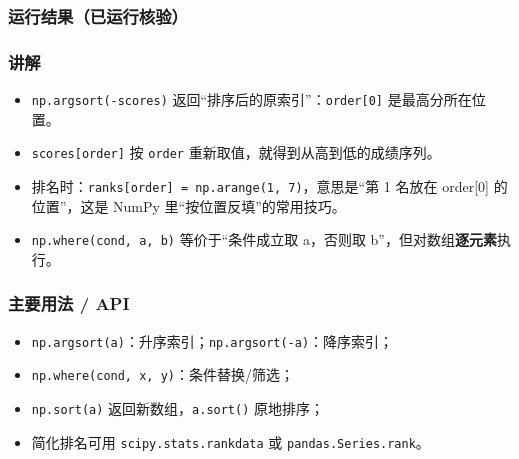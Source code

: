 \subsubsection{运行结果（已运行核验）}\label{ux8fd0ux884cux7ed3ux679cux5df2ux8fd0ux884cux6838ux9a8c-4}

\begin{Shaded}
\begin{Highlighting}[]
\end{Highlighting}
\end{Shaded}

\subsubsection{讲解}\label{ux8bb2ux89e3-4}

\begin{itemize}
\tightlist
\item
  \texttt{np.argsort(-scores)}
  返回``排序后的原索引''：\texttt{order{[}0{]}} 是最高分所在位置。
\item
  \texttt{scores{[}order{]}} 按 \texttt{order}
  重新取值，就得到从高到低的成绩序列。
\item
  排名时：\texttt{ranks{[}order{]}\ =\ np.arange(1,\ 7)}，意思是``第 1
  名放在 order{[}0{]} 的位置''，这是 NumPy 里``按位置反填''的常用技巧。
\item
  \texttt{np.where(cond,\ a,\ b)} 等价于``条件成立取 a，否则取
  b''，但对数组\textbf{逐元素}执行。
\end{itemize}

\subsubsection{主要用法 / API}\label{ux4e3bux8981ux7528ux6cd5-api-4}

\begin{itemize}
\tightlist
\item
  \texttt{np.argsort(a)}：升序索引；\texttt{np.argsort(-a)}：降序索引；
\item
  \texttt{np.where(cond,\ x,\ y)}：条件替换/筛选；
\item
  \texttt{np.sort(a)} 返回新数组，\texttt{a.sort()} 原地排序；
\item
  简化排名可用 \texttt{scipy.stats.rankdata} 或
  \texttt{pandas.Series.rank}。
\end{itemize}

